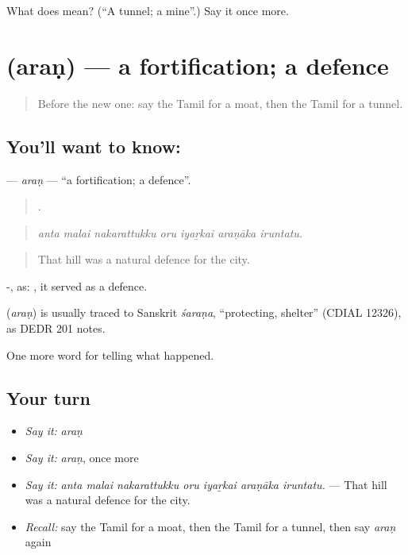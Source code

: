 \begin{tcolorbox}[breakable,colback=teal!4,colframe=teal!35!black,title={Before you move on}]
What does  mean? (\textquotedblleft{}A tunnel; a mine\textquotedblright{}.) Say it once more.
\end{tcolorbox}
\section[\texorpdfstring{\ta{அரண்} (araṇ)}{அரண் (araṇ)}]{ (araṇ) — a fortification; a defence}

\label{lesson:TA-C335-aran}



\begin{quote}
Before the new one: say the Tamil for a moat, then the Tamil for a tunnel.
\end{quote}

\subsection*{You'll want to know: }
\textbf{} — \emph{araṇ} — \textquotedblleft{}a fortification; a defence\textquotedblright{}.

\begin{quote}
      .
\end{quote}

\begin{quote}
\emph{anta malai nakarattukku oru iyaṟkai araṇāka iruntatu.}
\end{quote}

\begin{quote}
That hill was a natural defence for the city.
\end{quote}

-, as:  , it served as a defence.

\begin{cousinweb}
\textbf{} (\emph{araṇ}) is usually traced to Sanskrit \emph{śaraṇa}, \textquotedblleft{}protecting, shelter\textquotedblright{} (CDIAL 12326), as DEDR 201 notes.
\end{cousinweb}

\begin{grammarlens}[title={What you've built}]
One more word for telling what happened.
\end{grammarlens}

\subsection*{Your turn}
\begin{itemize}
\raggedright
  \item \emph{Say it:} \emph{araṇ}
  \item \emph{Say it:} \emph{araṇ}, once more
  \item \emph{Say it:} \emph{anta malai nakarattukku oru iyaṟkai araṇāka iruntatu.} — That hill was a natural defence for the city.
  \item \emph{Recall:} say the Tamil for a moat, then the Tamil for a tunnel, then say \emph{araṇ} again
\end{itemize}

